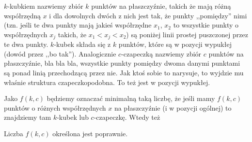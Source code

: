  $k$-kubkiem nazwiemy zbiór $k$ punktów na płaszczyźnie, takich że mają różną współrzędną $x$ i dla dowolnych dwóch z nich jest tak, że punkty ,,pomiędzy'' nimi (tzn. jeśli te dwa punkty mają jakieś współrzędne $x_1$, $x_2$ to wszystkie punkty o współrzędnych $x_j$ takich, że $x_1 < x_j < x_2$) są poniżej linii prostej puszczonej przez te dwa punkty. $k$-kubek składa się z $k$ punktów, które są w pozycji wypukłej (dowód przez ,,bo tak'').  Analogicznie $c$-czapeczką nazwiemy zbiór $c$ punktów na płaszczyźnie, bla bla bla, wszystkie punkty pomiędzy dwoma danymi punktami są ponad linią przechodzącą przez nie. Jak ktoś sobie to narysuje, to wyjdzie mu właśnie struktura czapeczkopodobna. To też jest w pozycji wypukłej. 

  Jako $f(k,c)$ będziemy oznaczać minimalną taką liczbę, że jeśli mamy $f(k,c)$ punktów o różnych współrzędnych $x$ na płaszczyźnie (i w pozycji ogólnej) to znajdziemy tam $k$-kubek lub $c$-czapeczkę. Wtedy też 
  \begin{theorem}
        Liczba $f(k,c)$ określona jest poprawnie.
    \end{theorem}
